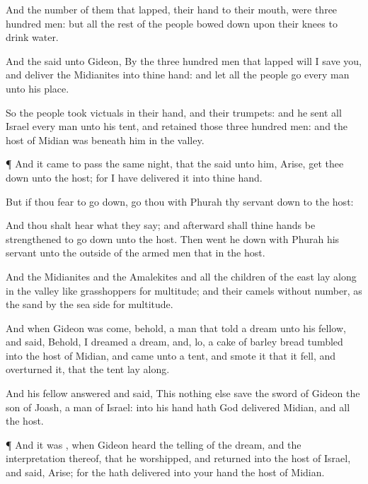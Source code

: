 {And the
number of them that
lapped,
{} their
hand to their
mouth, were
three
hundred
men: but all the
rest of the
people bowed
down upon their
knees to
drink
water.

And the
{}
said unto
Gideon, By the
three
hundred
men that
lapped will I
save you, and
deliver the
Midianites into thine
hand: and let all the
{}
people
go every
man unto his
place.

So the
people
took
victuals in their
hand, and their
trumpets: and he
sent
all
{}
Israel every
man unto his
tent, and
retained those
three
hundred
men: and the
host of
Midian was beneath him in the
valley.


\par }{\PP {}¶ And it came to pass the same
night, that the
{}
said unto him,
Arise, get thee
down unto the
host; for I have
delivered it into thine
hand.

But if thou
fear to go
down,
go thou with
Phurah thy
servant
down to the
host:

And thou shalt
hear what they
say; and
afterward shall thine
hands be
strengthened to go
down unto the
host. Then went he
down with
Phurah his
servant unto the
outside of the armed
men that
{} in the
host.

And the
Midianites and the
Amalekites and all the
children of the
east
lay along in the
valley like
grasshoppers for
multitude; and their
camels
{} without
number, as the
sand by the
sea
side for
multitude.

And when
Gideon was
come, behold,
{} a
man that
told a
dream unto his
fellow, and
said, Behold, I
dreamed a
dream, and, lo, a
cake of
barley
bread
tumbled into the
host of
Midian, and
came unto a
tent, and
smote it that it
fell, and
overturned it, that the
tent lay
along.

And his
fellow
answered and
said, This
{} nothing else save the
sword of
Gideon the
son of
Joash, a
man of
Israel:
{} into his
hand hath
God
delivered
Midian, and all the
host.


\par }{\PP {}¶ And it was
{}, when
Gideon
heard the
telling of the
dream, and the
interpretation thereof, that he
worshipped, and
returned into the
host of
Israel, and
said,
Arise; for the
{} hath
delivered into your
hand the
host of
Midian.


}
